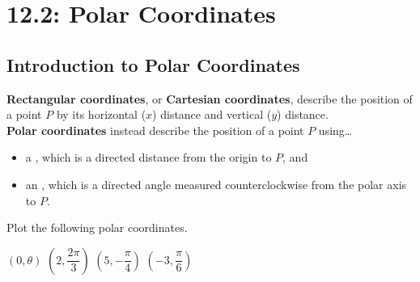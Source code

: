 \documentclass[12pt]{article}
\begin{document}
\section*{12.2: Polar Coordinates}


\vspace{5mm}

\subsection*{Introduction to Polar Coordinates}

\textbf{Rectangular coordinates}, or \textbf{Cartesian coordinates}, describe the position of a point $P$ by its horizontal ($x$) distance and vertical ($y$) distance.\\

\textbf{Polar coordinates} instead describe the position of a point $P$ using\dots
\begin{itemize}
	\item a \underline{\hspace{80mm}}, which is a directed distance from the origin to $P$, and
	\item an \underline{\hspace{80mm}}, which is a directed angle measured counterclockwise from the polar axis to $P$.
\end{itemize}

\newpage


\Example Plot the following polar coordinates.

\begin{center}

\hfill $(0,\theta)$ \hfill $\left(2,\dfrac{2\pi}{3}\right)$ \hfill $\left(5,-\dfrac{\pi}{4}\right)$ \hfill $\left(-3,\dfrac{\pi}{6}\right)$ \hfill
\end{center}
\end{document}

